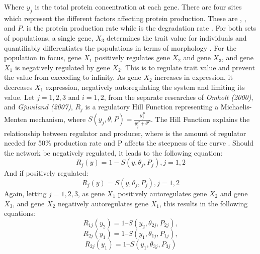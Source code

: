 Where $y_j$ is the total protein concentration at each gene. There are four sites which represent the different factors affecting protein production. These are \textit{\textalpha}, \textit{\textgamma}, \textit{\texttheta} and $P$. \textit{\textalpha} is the protein production rate while \textit{\textgamma} is the degradation rate \cite{omholt2000gene}. For both sets of populations, a single gene, $X_3$ determines the trait value for individuals and quantifiably differentiates the populations in terms of morphology \cite{orr2001genetics}. For the population in focus, gene $X_1$ positively regulates gene $X_2$ and gene $X_3$, and gene $X_1$ is negatively regulated by gene $X_2$. This is to regulate trait value and prevent the value from exceeding to infinity. As gene $X_2$ increases in expression, it decreases $X_1$ expression, negatively autoregulating the system and limiting its value. Let $j = {1,2,3}$ and $i = {1,2}$, from the separate researches of \textit{Omholt (2000)}, and \textit{Gjuvsland (2007)}, $R_{j}$ is a regulatory Hill Function representing a Michaelis-Menten mechanism, where $S(y_j,\theta,P) = \frac{y_j^P}{y_j^P+\theta^P}$. The Hill Function explains the relationship between regulator and producer, where \texttheta is the amount of regulator needed for 50\% production rate and P affects the steepness of the curve \cite{gjuvsland2007statistical,omholt2000gene}. Should the network be negatively regulated, it leads to the following equation:
\begin{equation*}
    R_{j}(y) = 1 - S(y, \theta_j , P_j), j = {1, 2} \label{eq:Negative autoregulation function} \tag{2}
\end{equation*}
And if positively regulated:
\begin{equation*}
	R_{j}(y) = S(y, \theta_j, P_j), j = {1, 2} \label{eq:Positive autoregulation function} \tag{3}
\end{equation*}
Again, letting $j = {1,2,3}$, as gene $X_1$ positively autoregulates gene $X_2$ and gene $X_3$, and gene $X_2$ negatively autoregulates gene $X_1$, this results in the following equations:
\begin{equation*}
    R_{1j}(y_2) = 1 – S(y_2, \theta_{2j}, P_{2j}) \label{eq:X1 negative autoregulation function} \tag{4.1},
\end{equation*}
\begin{equation*}
    R_{2j}(y_1) = 1 – S(y_1, \theta_{1j}, P_{1j}) \label{eq:X2 positive autoregulation function} \tag{4.2},
\end{equation*}
\begin{equation*}
    R_{2j}(y_1) = 1 – S(y_1, \theta_{3j}, P_{3j}) \label{eq:X3 positive autoregulation function} \tag{4.3}
\end{equation*}
